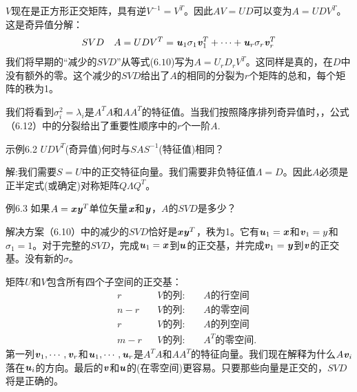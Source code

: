 $V$现在是正方形正交矩阵，具有逆$V^{-1}=V^{T}$。因此$AV=UD$可以变为$A=UDV^{T}$。这是奇异值分解：
\begin{align}
SVD & &  A=UDV^{T}=\textbf{\textit{u}}_{1}\sigma_{ 1}\textbf{\textit{v}}^{T}_{1}+\cdots+\textbf{\textit{u}}_{r}\sigma_{ r}\textbf{\textit{v}}^{T}_{ r}
\end{align}
我们将早期的“减少的$SVD$”从等式($6.10$)写为$A=U_{r}D_{r}V^{T}$。这同样是真的，在$D$中没有额外的零。这个减少的$SVD$给出了$A$的相同的分裂为$r$个矩阵的总和，每个矩阵的秩为1。

我们将看到$ \sigma^{2}_{i}=\lambda_{i}$是$A^{T}A$和$AA^{T}$的特征值。当我们按照降序排列奇异值时，，公式（6.12）中的分裂给出了重要性顺序中的$r$个一阶$A$.

示例6.2 $UDV^{T}$(奇异值)何时与$SAS^{-1}$(特征值)相同？

解:我们需要$S=U$中的正交特征向量。我们需要非负特征值$ \Lambda = D $。因此$A$必须是正半定式(或确定)对称矩阵$Q \Lambda Q^{T}$。

例6.3 如果$A=\textbf{\textit{x}}\textbf{\textit{y}}^{T}$单位矢量$\textbf{\textit{x}}$和$\textbf{\textit{y}}$，$A$的$SVD$是多少？

解决方案（6.10）中的减少的$SVD$恰好是$\textbf{\textit{x}}\textbf{\textit{y}}^{T}$，秩为1。它有$\textbf{\textit{u}}_{1}=\textbf{\textit{x}}$和$\textbf{\textit{v}}_{1}=y$和$\sigma_{1}=1$。对于完整的$SVD$，完成$\textbf{\textit{u}}_{1}=\textbf{\textit{x}}$到$\textbf{\textit{u}}$的正交基，并完成$\textbf{\textit{v}}_{1}=\textbf{\textit{y}}$到$\textbf{\textit{v}}$的正交基。没有新的$\sigma$。

矩阵$U$和$V$包含所有四个子空间的正交基：
\begin{align*}
&   &r&                &V\text{的列:}&          &A\text{的行空间} \\ 
&   &n-r&               &V\text{的列: }&         &A\text{的零空间 }\\
&   &r &               &V\text{的列:}&         &A\text{的列空间} \\
&   &m-r &             &V\text{的列:}&          &A^{T} \text{的零空间}.
\end{align*}
第一列$\textbf{\textit{v}}_{1},\cdots,\textbf{\textit{v}}_{r}$和$\textbf{\textit{u}}_{1},\cdots,\textbf{\textit{u}}_{r}$是$A^{T}A$和$AA^{T}$的特征向量。我们现在解释为什么$A\textbf{\textit{v}}_{i}$落在$\textbf{\textit{u}}_{i}$的方向。最后的$\textbf{\textit{v}}$和$\textbf{\textit{u}}$的(在零空间)更容易。只要那些向量是正交的，$SVD$将是正确的。

